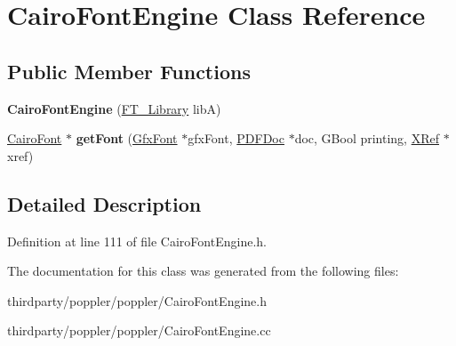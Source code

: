 \hypertarget{class_cairo_font_engine}{}\section{Cairo\+Font\+Engine Class Reference}
\label{class_cairo_font_engine}
\subsection*{Public Member Functions}
\begin{DoxyCompactItemize}
\item 
\mbox{\label{class_cairo_font_engine_a9a403e9f007a9fa3d7330f9ce5636424}} 
{\bfseries Cairo\+Font\+Engine} (\hyperlink{struct_f_t___library_rec__}{F\+T\+\_\+\+Library} libA)
\item 
\mbox{\label{class_cairo_font_engine_ab00d5a9fdb7080c99325195f9889f21f}} 
\hyperlink{class_cairo_font}{Cairo\+Font} $\ast$ {\bfseries get\+Font} (\hyperlink{class_gfx_font}{Gfx\+Font} $\ast$gfx\+Font, \hyperlink{class_p_d_f_doc}{P\+D\+F\+Doc} $\ast$doc, G\+Bool printing, \hyperlink{class_x_ref}{X\+Ref} $\ast$xref)
\end{DoxyCompactItemize}


\subsection{Detailed Description}


Definition at line 111 of file Cairo\+Font\+Engine.\+h.



The documentation for this class was generated from the following files\+:\begin{DoxyCompactItemize}
\item 
thirdparty/poppler/poppler/Cairo\+Font\+Engine.\+h\item 
thirdparty/poppler/poppler/Cairo\+Font\+Engine.\+cc\end{DoxyCompactItemize}
